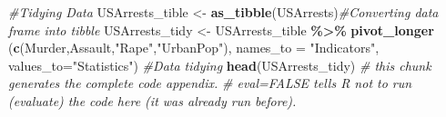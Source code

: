 \documentclass[
]{article}
\newenvironment{Shaded}{\begin{snugshade}}{\end{snugshade}}
\newcommand{\AttributeTok}[1]{\textcolor[rgb]{0.13,0.29,0.53}{#1}}
\newcommand{\CommentTok}[1]{\textcolor[rgb]{0.56,0.35,0.01}{\textit{#1}}}
\newcommand{\FunctionTok}[1]{\textcolor[rgb]{0.13,0.29,0.53}{\textbf{#1}}}
\newcommand{\NormalTok}[1]{#1}
\newcommand{\OtherTok}[1]{\textcolor[rgb]{0.56,0.35,0.01}{#1}}
\newcommand{\SpecialCharTok}[1]{\textcolor[rgb]{0.81,0.36,0.00}{\textbf{#1}}}
\newcommand{\StringTok}[1]{\textcolor[rgb]{0.31,0.60,0.02}{#1}}
\begin{document}
\begin{Shaded}
\begin{Highlighting}[]
\CommentTok{\#Tidying Data}
\NormalTok{USArrests\_tible }\OtherTok{\textless{}{-}} \FunctionTok{as\_tibble}\NormalTok{(USArrests)}\CommentTok{\#Converting data frame into tibble }
\NormalTok{USArrests\_tidy }\OtherTok{\textless{}{-}}\NormalTok{ USArrests\_tible }\SpecialCharTok{\%\textgreater{}\%}
  \FunctionTok{pivot\_longer}\NormalTok{ (}\FunctionTok{c}\NormalTok{(}\StringTok{\textquotesingle{}Murder\textquotesingle{}}\NormalTok{,}\StringTok{\textquotesingle{}Assault\textquotesingle{}}\NormalTok{,}\StringTok{"Rape"}\NormalTok{,}\StringTok{"UrbanPop"}\NormalTok{), }\AttributeTok{names\_to =} \StringTok{"Indicators"}\NormalTok{, }\AttributeTok{values\_to=}\StringTok{"Statistics"}\NormalTok{) }\CommentTok{\#Data tidying}
\FunctionTok{head}\NormalTok{(USArrests\_tidy)}
\CommentTok{\# this chunk generates the complete code appendix. }
\CommentTok{\# eval=FALSE tells R not to run (\textasciigrave{}\textasciigrave{}evaluate\textquotesingle{}\textquotesingle{}) the code here (it was already run before).}
\end{Highlighting}
\end{Shaded}
\end{document}
